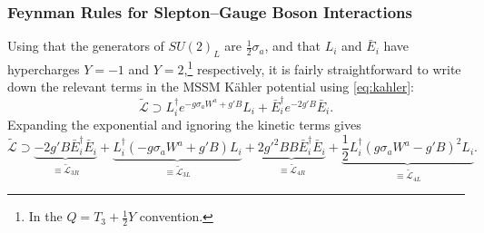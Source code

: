 \subsubsection{Feynman Rules for Slepton--Gauge Boson Interactions}
Using that the generators of $SU(2)_L$ are $\frac{1}{2}\sigma_a$,
and that $L_i$ and $\bar E_i$ have hypercharges $Y=-1$ and $Y=2$,\footnote{
    In the $Q=T_3+\frac{1}{2}Y$ convention. 
} respectively,
it is fairly straightforward to write down the relevant terms in the MSSM K\"ahler potential using \cref{eq:kahler}:
\begin{equation*}
    \tilde{\mathcal{L}} \supset L_i^\dagger e^{-g \sigma_a W^a + g'B} L_i + \bar{E}_i^\dagger e^{-2g'B} \bar{E}_i.
\end{equation*}
Expanding the exponential and ignoring the kinetic terms gives
\begin{equation}
    \tilde{\mathcal{L}} \supset
    \underbrace{-2g'B \bar{E}_i^\dagger \bar{E}_i}_{\equiv \tilde{\mathcal{L}}_{3R}}
    + \underbrace{L_i^\dagger (-g\sigma_a W^a + g'B) L_i}_{\equiv \tilde{\mathcal{L}}_{3L}}
    + \underbrace{2g'^2 BB \bar{E}_i^\dagger \bar{E}_i}_{\equiv \tilde{\mathcal{L}}_{4R}}
    + \underbrace{\frac{1}{2} L_i^\dagger (g\sigma_a W^a - g'B)^2 L_i}_{\equiv \tilde{\mathcal{L}}_{4L}}.
    \label{eq:slepton_kahler}
\end{equation}


